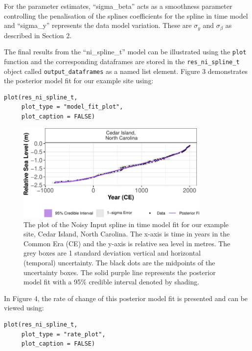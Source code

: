 \normalsize

For the parameter estimates, ``sigma\_beta'' acts as a smoothness parameter controlling the penalisation of the splines coefficients for the spline in time model and ``sigma\_y'' represents the data model variation. These are \(\sigma_y\) and \(\sigma_{\beta}\) as described in Section 2.

The final results from the ``ni\_spline\_t'' model can be illustrated using the \texttt{plot} function and the corresponding dataframes are stored in the \texttt{res\_ni\_spline\_t} object called \texttt{output\_dataframes} as a named list element. Figure 3 demonstrates the posterior model fit for our example site using:

\scriptsize

\begin{verbatim}
plot(res_ni_spline_t,
     plot_type = "model_fit_plot",
     plot_caption = FALSE)
\end{verbatim}

\begin{figure}

{\centering \includegraphics[width=360px]{reslr_files/figure-latex/nisplinemodfit-1} 

}

\caption{The plot of the Noisy Input spline in time model fit for our example site, Cedar Island, North Carolina. The x-axis is time in years in the Common Era (CE) and the y-axis is relative sea level in metres. The grey boxes are 1 standard deviation vertical and horizontal (temporal) uncertainty. The black dots are the midpoints of the uncertainty boxes. The solid purple line represents the posterior model fit with a 95\% credible interval denoted by shading.}\label{fig:nisplinemodfit}
\end{figure}
\normalsize

In Figure 4, the rate of change of this posterior model fit is presented and can be viewed using:

\scriptsize

\begin{verbatim}
plot(res_ni_spline_t,
     plot_type = "rate_plot",
     plot_caption = FALSE)
\end{verbatim}


